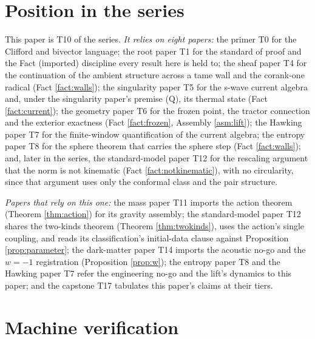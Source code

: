 \documentclass[11pt]{article}
\theoremstyle{definition}
\begin{document}
\section{Position in the series}\label{sec:position}

This paper is T10 of the series. \emph{It relies on eight papers:} the primer T0 \cite{ButlerT0} for the Clifford and bivector language; the root paper T1 \cite{ButlerT1} for the standard of proof and the Fact (imported) discipline every result here is held to; the sheaf paper T4 \cite{ButlerT4} for the continuation of the ambient structure across a tame wall and the corank-one radical (Fact \ref{fact:walls}); the singularity paper T5 \cite{ButlerT5} for the s-wave current algebra and, under the singularity paper's premise (Q), its thermal state (Fact \ref{fact:current}); the geometry paper T6 \cite{ButlerT6} for the frozen point, the tractor connection and the exterior exactness (Fact \ref{fact:frozen}, Assembly \ref{asm:lift}); the Hawking paper T7 \cite{ButlerT7} for the finite-window quantification of the current algebra; the entropy paper T8 \cite{ButlerT8} for the sphere theorem that carries the sphere step (Fact \ref{fact:walls}); and, later in the series, the standard-model paper T12 \cite{ButlerT12} for the rescaling argument that the norm is not kinematic (Fact \ref{fact:notkinematic}), with no circularity, since that argument uses only the conformal class and the pair structure.

\emph{Papers that rely on this one:} the mass paper T11 \cite{ButlerT11} imports the action theorem (Theorem \ref{thm:action}) for its gravity assembly; the standard-model paper T12 \cite{ButlerT12} shares the two-kinds theorem (Theorem \ref{thm:twokinds}), uses the action's single coupling, and reads its classification's initial-data clause against Proposition \ref{prop:parameter}; the dark-matter paper T14 \cite{ButlerT14} imports the acoustic no-go and the $w = -1$ registration (Proposition \ref{prop:w}); the entropy paper T8 \cite{ButlerT8} and the Hawking paper T7 \cite{ButlerT7} refer the engineering no-go and the lift's dynamics to this paper; and the capstone T17 \cite{ButlerT17} tabulates this paper's claims at their tiers.

\section{Machine verification}\label{sec:verification}
\end{document}
